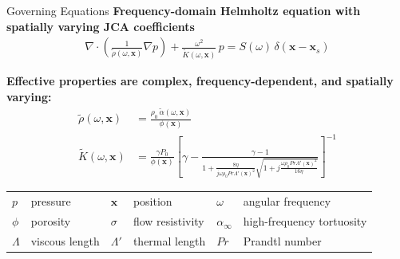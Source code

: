 \documentclass[aspectratio=169,11pt]{beamer}
\begin{document}
\begin{frame}{Governing Equations}
  \small
  \textbf{Frequency-domain Helmholtz equation with spatially varying JCA coefficients}
  \begin{align*}
    \nabla \cdot \left( \frac{1}{\tilde{\rho}(\omega, \mathbf{x})} \nabla p \right) + \frac{\omega^2}{\tilde{K}(\omega, \mathbf{x})} \, p = S(\omega) \, \delta(\mathbf{x} - \mathbf{x}_s)
  \end{align*}

  \vspace{0.2cm}
  \textbf{Effective properties are complex, frequency-dependent, and spatially varying:}
  \begin{align*}
    \tilde{\rho}(\omega, \mathbf{x}) &= \frac{\rho_0 \, \tilde{\alpha}(\omega, \mathbf{x})}{\phi(\mathbf{x})} \\
    \tilde{K}(\omega, \mathbf{x}) &= \frac{\gamma P_0}{\phi(\mathbf{x})} \left[ \gamma - \frac{\gamma - 1}{1 + \frac{8 \eta}{j \omega \rho_0 Pr \Lambda'(\mathbf{x})^2} \sqrt{1 + j \frac{\omega \rho_0 Pr \Lambda'(\mathbf{x})^2}{16 \eta}}} \right]^{-1}
  \end{align*}

  \vspace{0.2cm}
  \footnotesize
  \begin{tabular}{llllll}
    $p$ & pressure & $\mathbf{x}$ & position & $\omega$ & angular frequency \\
    $\phi$ & porosity & $\sigma$ & flow resistivity & $\alpha_\infty$ & high-frequency tortuosity \\
    $\Lambda$ & viscous length & $\Lambda'$ & thermal length & $Pr$ & Prandtl number
  \end{tabular}
\end{frame}
\end{document}
